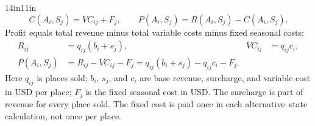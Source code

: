 \begin{CalculationLandscape}{14in}{11in}
\[C(A_i,S_j)=VC_{ij}+F_j,\qquad P(A_i,S_j)=R(A_i,S_j)-C(A_i,S_j).\]
Profit equals total revenue minus total variable costs minus fixed seasonal costs:
\begin{align*}
R_{ij}&=q_{ij}(b_i+s_j), & VC_{ij}&=q_{ij}c_i,\\
P(A_i,S_j)&=R_{ij}-VC_{ij}-F_j
=q_{ij}(b_i+s_j)-q_{ij}c_i-F_j.
\end{align*}
Here $q_{ij}$ is places sold; $b_i$, $s_j$, and $c_i$ are base revenue, surcharge,
and variable cost in USD per place; $F_j$ is the fixed seasonal cost in USD.
The surcharge is part of revenue for every place sold. The fixed cost is paid
once in each alternative--state calculation, not once per place.
\end{CalculationLandscape}
